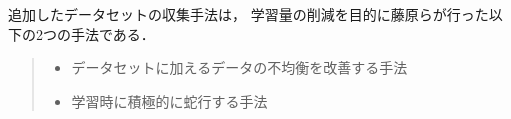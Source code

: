 追加したデータセットの収集手法は，
学習量の削減を目的に藤原ら\cite{fujiwara2023}が行った以下の2つの手法である．
\begin{quote}
    \begin{itemize}
     \item データセットに加えるデータの不均衡を改善する手法
     \item 学習時に積極的に蛇行する手法
    \end{itemize}
   \end{quote}

